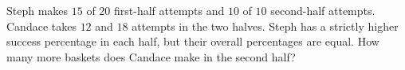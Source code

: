 Steph makes $15$ of $20$ first-half attempts and $10$ of $10$ second-half attempts. Candace takes $12$ and $18$ attempts in the two halves. Steph has a strictly higher success percentage in each half, but their overall percentages are equal. How many more baskets does Candace make in the second half?
